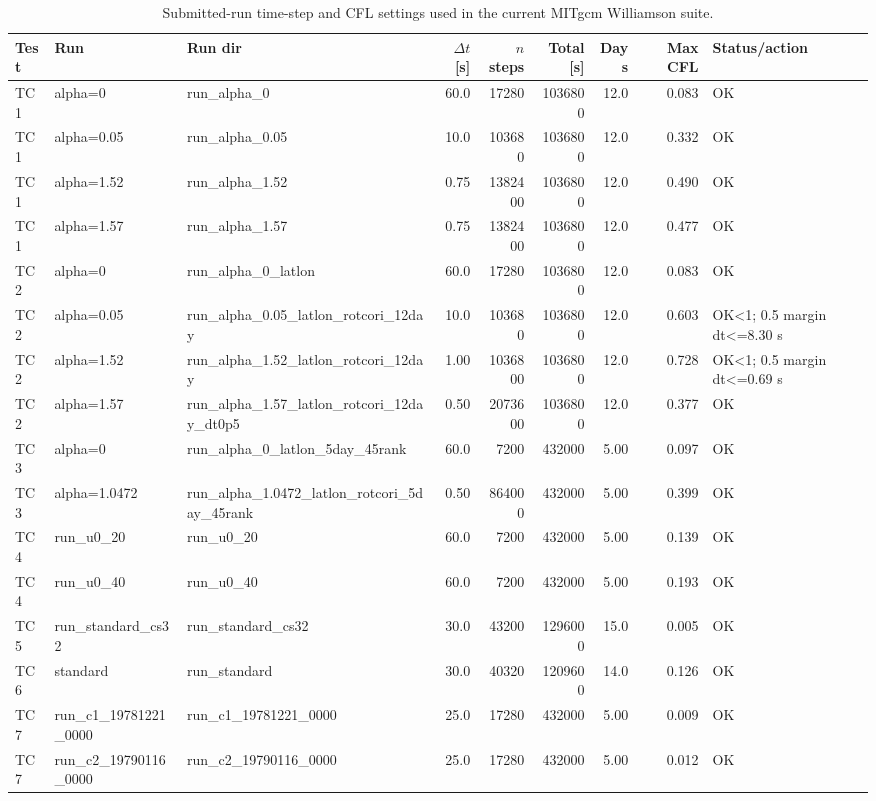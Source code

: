 \begin{table}[htbp]
\centering
\caption{Submitted-run time-step and CFL settings used in the current MITgcm Williamson suite.}
\label{tab:submitted_time_step_cfl}
\begin{tabular}{lllrrrrrl}
\toprule
Test & Run & Run dir & $\Delta t$ [s] & $n$ steps & Total [s] & Days & Max CFL & Status/action \\
\midrule
TC1 & alpha=0 & run\_alpha\_0 & 60.0 & 17280 & 1036800 & 12.0 & 0.083 & OK \\
TC1 & alpha=0.05 & run\_alpha\_0.05 & 10.0 & 103680 & 1036800 & 12.0 & 0.332 & OK \\
TC1 & alpha=1.52 & run\_alpha\_1.52 & 0.75 & 1382400 & 1036800 & 12.0 & 0.490 & OK \\
TC1 & alpha=1.57 & run\_alpha\_1.57 & 0.75 & 1382400 & 1036800 & 12.0 & 0.477 & OK \\
TC2 & alpha=0 & run\_alpha\_0\_latlon & 60.0 & 17280 & 1036800 & 12.0 & 0.083 & OK \\
TC2 & alpha=0.05 & run\_alpha\_0.05\_latlon\_rotcori\_12day & 10.0 & 103680 & 1036800 & 12.0 & 0.603 & OK<1; 0.5 margin dt<=8.30 s \\
TC2 & alpha=1.52 & run\_alpha\_1.52\_latlon\_rotcori\_12day & 1.00 & 1036800 & 1036800 & 12.0 & 0.728 & OK<1; 0.5 margin dt<=0.69 s \\
TC2 & alpha=1.57 & run\_alpha\_1.57\_latlon\_rotcori\_12day\_dt0p5 & 0.50 & 2073600 & 1036800 & 12.0 & 0.377 & OK \\
TC3 & alpha=0 & run\_alpha\_0\_latlon\_5day\_45rank & 60.0 & 7200 & 432000 & 5.00 & 0.097 & OK \\
TC3 & alpha=1.0472 & run\_alpha\_1.0472\_latlon\_rotcori\_5day\_45rank & 0.50 & 864000 & 432000 & 5.00 & 0.399 & OK \\
TC4 & run\_u0\_20 & run\_u0\_20 & 60.0 & 7200 & 432000 & 5.00 & 0.139 & OK \\
TC4 & run\_u0\_40 & run\_u0\_40 & 60.0 & 7200 & 432000 & 5.00 & 0.193 & OK \\
TC5 & run\_standard\_cs32 & run\_standard\_cs32 & 30.0 & 43200 & 1296000 & 15.0 & 0.005 & OK \\
TC6 & standard & run\_standard & 30.0 & 40320 & 1209600 & 14.0 & 0.126 & OK \\
TC7 & run\_c1\_19781221\_0000 & run\_c1\_19781221\_0000 & 25.0 & 17280 & 432000 & 5.00 & 0.009 & OK \\
TC7 & run\_c2\_19790116\_0000 & run\_c2\_19790116\_0000 & 25.0 & 17280 & 432000 & 5.00 & 0.012 & OK \\

\end{tabular}
\end{table}
